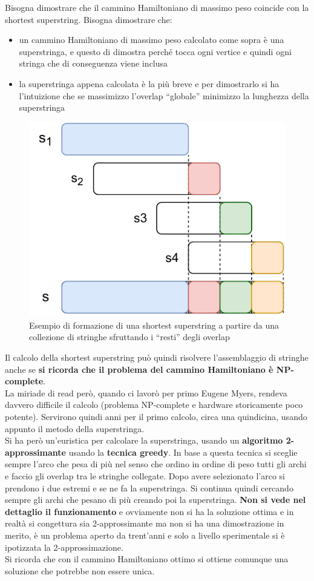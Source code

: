 \documentclass[a4paper,12pt, oneside]{book}
\begin{document}
Bisogna dimostrare che il cammino Hamiltoniano di massimo peso coincide con la
shortest superstring. Bisogna dimostrare che:
\begin{itemize}
  \item un cammino Hamiltoniano di massimo peso calcolato come sopra è una
  superstringa, e questo di dimostra perché tocca ogni vertice e quindi ogni
  stringa che di conseguenza viene inclusa
  \item la superstringa appena calcolata è la più breve e per dimostrarlo si ha
  l'intuizione che se massimizzo l'overlap ``globale'' minimizzo la lunghezza
  della superstringa 
\end{itemize}
\begin{figure}
  \centering
  \includegraphics[scale = 0.8]{img/ssp.pdf}
  \caption{Esempio di formazione di una shortest superstring a partire da una
    collezione di stringhe sfruttando i ``resti'' degli overlap}
  \label{fig:ssp}
\end{figure}
Il calcolo della shortest superstring può quindi risolvere l'assemblaggio di
stringhe anche se \textbf{si ricorda che il problema del cammino Hamiltoniano è
  NP-complete}. \\
La miriade di read però, quando ci lavorò per primo Eugene Myers, rendeva
davvero difficile il calcolo (problema NP-complete e hardware storicamente poco
potente). Servirono quindi anni per il primo calcolo, circa una quindicina,
usando appunto il metodo della superstringa.\\
Si ha però un'euristica per calcolare la superstringa, usando un
\textbf{algoritmo 2-approssimante} usando la \textbf{tecnica greedy}. In base a
questa tecnica si sceglie sempre l'arco che pesa di più nel senso che ordino in
ordine di peso tutti gli archi e faccio gli overlap tra le stringhe collegate.
Dopo avere selezionato l'arco si prendono i due estremi e se ne fa la
superstringa. Si continua quindi cercando sempre gli archi che pesano di più
creando poi la superstringa. \textbf{Non si vede nel dettaglio il funzionamento}
e ovviamente non si ha la soluzione ottima e in realtà si congettura sia
2-approssimante ma non si ha una dimostrazione in merito, è un problema aperto
da trent'anni e solo a livello sperimentale si è ipotizzata la
2-approssimazione.\\
Si ricorda che con il cammino Hamiltoniano ottimo si ottiene comunque una
soluzione che potrebbe non essere unica.
\end{document}
